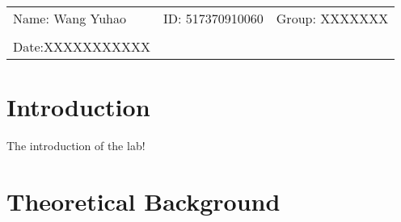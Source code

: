\documentclass{article}
\begin{document}
\large
\vspace*{0.25cm}

\hrulefill

\thispagestyle{empty}

\begin{center}
\begin{large}
\end{large}

\hrulefill

\vspace*{5cm}
\begin{Large}
\end{Large}

\vspace{2em}

\begin{large}
\sc{{
\vspace{0.5em}
}}
\end{large}
\end{center}


\vfill

\begin{table}[h!]
\flushleft
\begin{tabular}{lll}
Name: Wang Yuhao \hspace*{2em}&
ID: 517370910060\hspace*{2em}
& Group: XXXXXXX\\
\\
Date:XXXXXXXXXXX
\end{tabular}
\end{table}

\hfill

\newpage
\section{Introduction}
The introduction of the lab!
\
\section{Theoretical Background}
\end{document}

